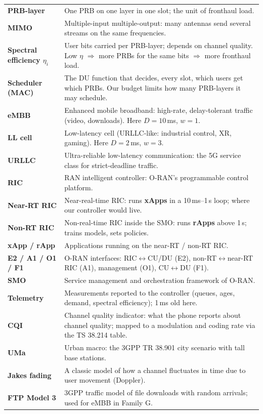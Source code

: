 \documentclass[11pt,a4paper]{article}
\begin{document}
\begin{longtable}{>{\raggedright\arraybackslash\bfseries}p{3.6cm}>{\raggedright\arraybackslash}p{12.2cm}}
PRB-layer & One PRB on one layer in one slot; the unit of fronthaul load. \\
MIMO & Multiple-input multiple-output: many antennas send several streams on the same frequencies. \\
Spectral efficiency $\eta_i$ & User bits carried per PRB-layer; depends on channel quality. Low $\eta$ $\Rightarrow$ more PRBs for the same bits $\Rightarrow$ more fronthaul load. \\
Scheduler (MAC) & The DU function that decides, every slot, which users get which PRBs. Our budget limits how many PRB-layers it may schedule. \\
eMBB & Enhanced mobile broadband: high-rate, delay-tolerant traffic (video, downloads). Here $D = 10$\,ms, $w = 1$. \\
LL cell & Low-latency cell (URLLC-like: industrial control, XR, gaming). Here $D = 2$\,ms, $w = 3$. \\
URLLC & Ultra-reliable low-latency communication: the 5G service class for strict-deadline traffic. \\
RIC & RAN intelligent controller: O-RAN's programmable control platform. \\
Near-RT RIC & Near-real-time RIC: runs \textbf{xApps} in a 10\,ms--1\,s loop; where our controller would live. \\
Non-RT RIC & Non-real-time RIC inside the SMO: runs \textbf{rApps} above 1\,s; trains models, sets policies. \\
xApp / rApp & Applications running on the near-RT / non-RT RIC. \\
E2 / A1 / O1 / F1 & O-RAN interfaces: RIC$\leftrightarrow$CU/DU (E2), non-RT$\leftrightarrow$near-RT RIC (A1), management (O1), CU$\leftrightarrow$DU (F1). \\
SMO & Service management and orchestration framework of O-RAN. \\
Telemetry & Measurements reported to the controller (queues, ages, demand, spectral efficiency); 1\,ms old here. \\
CQI & Channel quality indicator: what the phone reports about channel quality; mapped to a modulation and coding rate via the TS 38.214 table. \\
UMa & Urban macro: the 3GPP TR 38.901 city scenario with tall base stations. \\
Jakes fading & A classic model of how a channel fluctuates in time due to user movement (Doppler). \\
FTP Model 3 & 3GPP traffic model of file downloads with random arrivals; used for eMBB in Family G. \\

\end{longtable}
\end{document}

